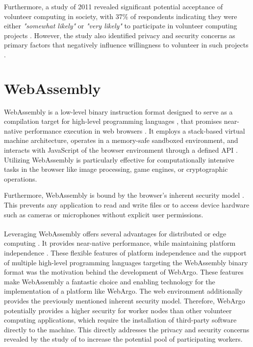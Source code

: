 Furthermore, a study of 2011 revealed significant potential acceptance of volunteer computing in society, with 37\% of respondents indicating they were either \emph{"somewhat likely"} or \emph{"very likely"} to participate in volunteer computing projects \cite{intro:volunteerStudy}. However, the study also identified privacy and security concerns as primary factors that negatively influence willingness to volunteer in such projects \cite{intro:volunteerStudy}.

\section{WebAssembly}
\label{sec:background:webassembly}
WebAssembly is a low-level binary instruction format designed to serve as a compilation target for high-level programming languages \cite{methodology:wasm, methodology:wasmW3C, methodology:wasm2}, that promises near-native performance execution in web browsers \cite{methodology:wasm, methodology:wasmW3C, relatedwork:wasmedgecomputing}. It employs a stack-based virtual machine architecture, operates in a memory-safe sandboxed environment, and interacts with JavaScript of the browser environment through a defined \ac{API} \cite{methodology:wasm, methodology:wasmW3C, methodology:wasm2, methodology:wasmdocu}. Utilizing WebAssembly is particularly effective for computationally intensive tasks in the browser \cite{methodology:wasm2, methodology:wasmW3C} like image processing, game engines, or cryptographic operations.

Furthermore, WebAssembly is bound by the browser's inherent security model \cite{methodology:wasmW3C, methodology:wasm2, methodology:wasmdocu}. This prevents any application to read and write ﬁles or to access device hardware such as cameras or microphones without explicit user permissions. 
\\~\\
Leveraging WebAssembly offers several advantages for distributed or edge computing \cite{relatedwork:wasmedgecomputing}. It provides near-native performance, while maintaining platform independence \cite{methodology:wasm, methodology:wasmW3C, relatedwork:wasmedgecomputing}. These flexible features of platform independence and the support of multiple high-level programming languages targeting the WebAssembly binary format \cite{methodology:wasmW3C} was the motivation behind the development of WebArgo. These features make WebAssembly a fantastic choice and enabling technology for the implementation of a platform like WebArgo. The web environment additionally provides the previously mentioned inherent security model. Therefore, WebArgo potentially provides a higher security for worker nodes than other volunteer computing applications, which require the installation of third-party software directly to the machine. This directly addresses the privacy and security concerns revealed by the study of \citeauthor{intro:volunteerStudy} \cite{intro:volunteerStudy} to increase the potential pool of participating workers.

